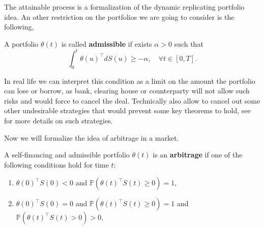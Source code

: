 The attainable process is a formalization of the dynamic replicating portfolio idea.
An other restriction on the portfolios we are going to consider is the following,
\begin{definition}
    A portfolio $\theta(t)$ is called \textbf{admissible} if exists $\alpha > 0$ such that
    \begin{equation*}
        \int^t_0 \theta(u)^\intercal dS(u) \geq -\alpha, \quad \forall t \in [0, T].
    \end{equation*}
\end{definition}
In real life we can interpret this condition as a limit on the amount the portfolio can lose or borrow,
as bank, clearing house or counterparty will not allow such risks and would force to cancel the deal.
Technically also allow to cancel out some other undesirable strategies that would prevent some key theorems to hold,
see \cite[Sec.~14.5 and 14.6]{steele_stochastic} for more details on such strategies.

Now we will formalize the idea of arbitrage in a market.
\begin{definition}[Arbitrage]\label{def:arbitrage}
    A self-financing and admissible portfolio $\theta(t)$ is an \textbf{arbitrage} if one of the following conditions hold for time $t$:
    \begin{enumerate}
        \item $\theta(0)^\intercal S(0) < 0$ and $\mathbb{P}(\theta(t)^\intercal S(t) \geq 0) = 1$,
        \item $\theta(0)^\intercal S(0) = 0$ and $\mathbb{P}(\theta(t)^\intercal S(t) \geq 0) = 1$ and $\mathbb{P}(\theta(t)^\intercal S(t) > 0) > 0$,
    \end{enumerate}
\end{definition}

